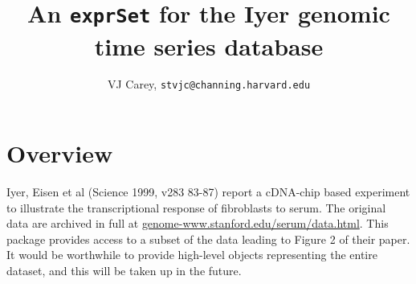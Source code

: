 \documentclass[12pt]{article}
\begin{document}
\title{An {\tt exprSet} for the Iyer genomic time series database}
\author{VJ Carey, {\tt stvjc@channing.harvard.edu}}
\maketitle

\section{Overview}
Iyer, Eisen et al (Science 1999, v283 83-87)
report a cDNA-chip based experiment to illustrate
the transcriptional response of fibroblasts to serum.
The original data are archived in full at 
\url{genome-www.stanford.edu/serum/data.html}.
This package provides access to a subset of the
data leading to Figure 2 of their paper.
It would be worthwhile to provide high-level objects
representing the entire dataset, and this will be
taken up in the future.
\end{document}
